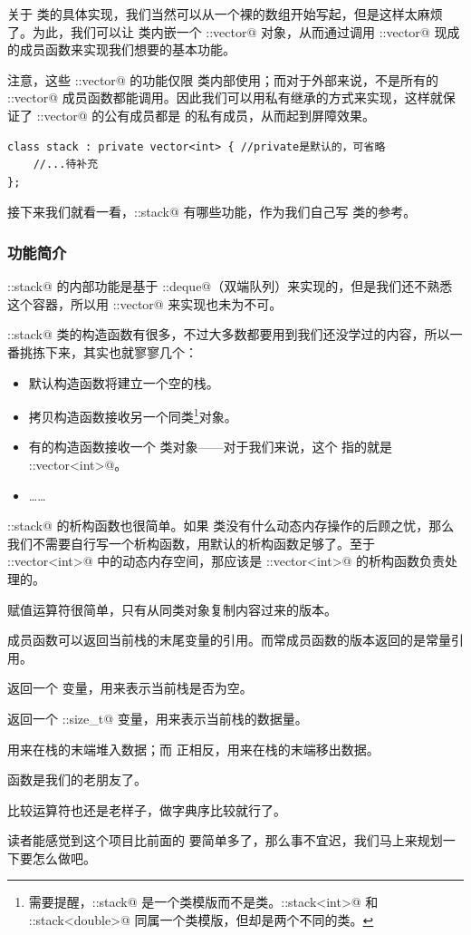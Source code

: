 关于 \lstinline@stack@ 类的具体实现，我们当然可以从一个裸的数组开始写起，但是这样太麻烦了。为此，我们可以让 \lstinline@stack@ 类内嵌一个 \lstinline@std::vector@ 对象，从而通过调用 \lstinline@std::vector@ 现成的成员函数来实现我们想要的基本功能。\par
注意，这些 \lstinline@std::vector@ 的功能仅限 \lstinline@stack@ 类内部使用；而对于外部来说，不是所有的 \lstinline@std::vector@ 成员函数都能调用。因此我们可以用私有继承的方式来实现，这样就保证了 \lstinline@std::vector@ 的公有成员都是 \lstinline@stack@ 的私有成员，从而起到屏障效果。
\begin{lstlisting}
class stack : private vector<int> { //private是默认的，可省略
    //...待补充
};
\end{lstlisting}
接下来我们就看一看，\lstinline@std::stack@ 有哪些功能，作为我们自己写 \lstinline@stack@ 类的参考。\par
\subsubsection*{功能简介}
\lstinline@std::stack@ 的内部功能是基于 \lstinline@std::deque@（双端队列）来实现的，但是我们还不熟悉这个容器，所以用 \lstinline@std::vector@ 来实现也未为不可。\par
\lstinline@std::stack@ 类的构造函数有很多，不过大多数都要用到我们还没学过的内容，所以一番挑拣下来，其实也就寥寥几个：
\begin{itemize}
    \item 默认构造函数将建立一个空的栈。
    \item 拷贝构造函数接收另一个同类\footnote{需要提醒，\lstinline@std::stack@ 是一个类模版而不是类。\lstinline@std::stack<int>@ 和 \lstinline@std::stack<double>@ 同属一个类模版，但却是两个不同的类。}对象。
    \item 有的构造函数接收一个 \lstinline@Container@ 类对象——对于我们来说，这个 \lstinline@Container@ 指的就是 \lstinline@std::vector<int>@。
    \item ……
\end{itemize}
\lstinline@std::stack@ 的析构函数也很简单。如果 \lstinline@stack@ 类没有什么动态内存操作的后顾之忧，那么我们不需要自行写一个析构函数，用默认的析构函数足够了。至于 \lstinline@std::vector<int>@ 中的动态内存空间，那应该是 \lstinline@std::vector<int>@ 的析构函数负责处理的。\par
赋值运算符很简单，只有从同类对象复制内容过来的版本。\par
\lstinline@top@ 成员函数可以返回当前栈的末尾变量的引用。而常成员函数的版本返回的是常量引用。\par
\lstinline@empty@ 返回一个 \lstinline@bool@ 变量，用来表示当前栈是否为空。\par
\lstinline@size@ 返回一个 \lstinline@std::size_t@ 变量，用来表示当前栈的数据量。\par
\lstinline@push@ 用来在栈的末端堆入数据；而 \lstinline@pop@ 正相反，用来在栈的末端移出数据。\par
\lstinline@swap@ 函数是我们的老朋友了。\par
比较运算符也还是老样子，做字典序比较就行了。\par
读者能感觉到这个项目比前面的 \lstinline@string@ 要简单多了，那么事不宜迟，我们马上来规划一下要怎么做吧。\par
